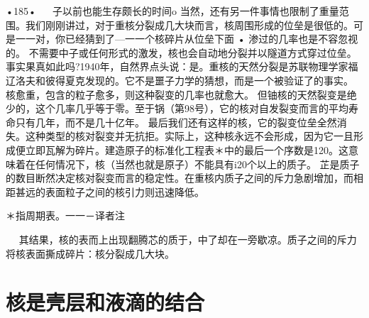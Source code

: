 •185•
  
子以前也能生存颇长的时间o
当然，还有另一件事情也限制了重量范围。我们刚刚讲过，对于重核分裂成几大块而言，核周围形成的位垒是很低的。可是一一对，你已经猜到了—一一个核碎片从位垒下面
•	渗过的几率也是不容忽视的。
不需要中子或任何形式的激发，核也会自动地分裂并以隧道方式穿过位垒。事实果真如此吗?1940年，自然界点头说：是。重核的天然分裂是苏联物理学家福辽洛夫和彼得夏克发现的。它不是噩子力学的猜想，而是一个被验证了的事实。
核愈重，包含的粒子愈多，则这种裂变的几率也就愈大。
但铀核的天然裂变是绝少的，这个几率几乎等于零。至于锅（第98号），它的核对自发裂变而言的平均寿命只有几年，而不是几十亿年。
最后我们还有这样的核，它的裂变位垒全然消失。这种类型的核对裂变并无抗拒。实际上，这种核永远不会形成，因为它一且形成便立即瓦解为碎片。建造原子的标准化工程表＊中的最后一个序数是120。这意味着在任何情况下，核（当然也就是原子）不能具有i20个以上的质子。
芷是质子的数目断然决定核对裂变而言的稳定性。在重核内质子之间的斥力急剧增加，而相距甚远的表面粒子之间的核引力则迅速降低。

＊指周期表。一一－译者注

  
其结果，核的表而上出现翻腾芯的质于，中了却在一旁歇凉。质子之间的斥力将核表面撕成碎片：核分裂成几大块。

\section{核是壳层和液滴的结合}

